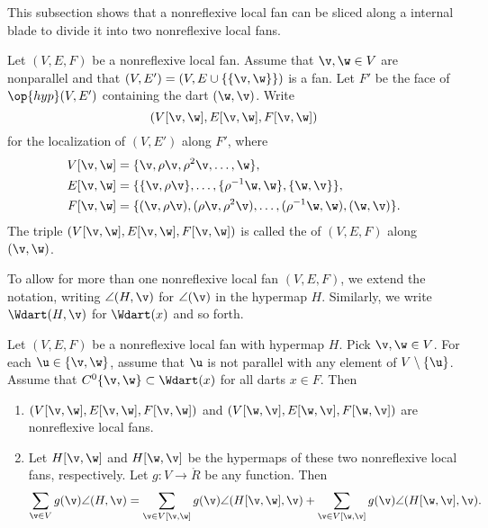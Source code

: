 This subsection shows that a nonreflexive local fan can be sliced
along a internal blade to divide it into two nonreflexive local fans.

\begin{definition}[slice]
 Let $(V,E,F)$ be a nonreflexive local fan.  Assume that
$\v,\w\in V$ are nonparallel and that $(V,E')=(V,E\cup
\{\{\v,\w\}\})$ is a fan.  Let $F'$ be the face of $\op{hyp}(V,E')$
containing the dart $(\w,\v)$.  Write
\[ (V[\v,\w],E[\v,\w],F[\v,\w])\] 
for the localization of $(V,E')$ along $F'$, where
\begin{align*}
  V[\v,\w] &= \{\v,\rho \v,\rho^2 \v,\ldots,\w\},\\
  E[\v,\w] &= \{\{\v,\rho \v\},\ldots,\{\rho^{-1}\w,\w\},\{\w,\v\}\},\\
  F[\v,\w] &= \{(\v,\rho \v),(\rho \v,\rho^2 \v),
 \ldots,(\rho^{-1}\w,\w),(\w,\v)\}.
\end{align*}
The triple $(V[\v,\w],E[\v,\w],F[\v,\w])$ is called the
 of $(V,E,F)$ along $(\v,\w)$.
\end{definition}
%

To allow for more than one nonreflexive local fan $(V,E,F)$, we  extend
the notation, writing $\angle(H,\v)$ for $\angle(\v)$ in the hypermap
$H$.  Similarly, we write $\Wdart(H,\v)$ for $\Wdart(x)$ and so
forth.  %
%


\begin{lemma}[slicing]\label{lemma:slice} Let
$(V,E,F)$ be a nonreflexive local fan with hypermap $H$.  Pick $\v,\w\in V$. For
each $\u\in \{\v,\w\}$, assume that $\u$ is not parallel with  any
element of $V\setminus\{\u\}$.  Assume that $C^0\{\v,\w\}\subset
\Wdart(x)$ for all darts $x\in F$.  Then
\begin{enumerate}\wasitemize 
\item $(V[\v,\w],E[\v,\w],F[\v,\w])$ and
$(V[\w,\v],E[\w,\v],F[\w,\v])$ are nonreflexive local fans.
\item Let $H[\v,\w]$ and $H[\w,\v]$ be the hypermaps of these two
  nonreflexive local fans, respectively.  Let $g:V\to\ring{R}$ be any
  function.  Then
\[ 
  \sum_{\v\in V} g(\v)\angle(H,\v) 
  = \sum_{\v\in V[\v,\w]}g(\v)\angle(H[\v,\w],\v) 
  + \sum_{\v\in V[\w,\v]}g(\v)\angle(H[\w,\v],\v).
\] 
\end{enumerate}\wasitemize 
\end{lemma}
%
%

